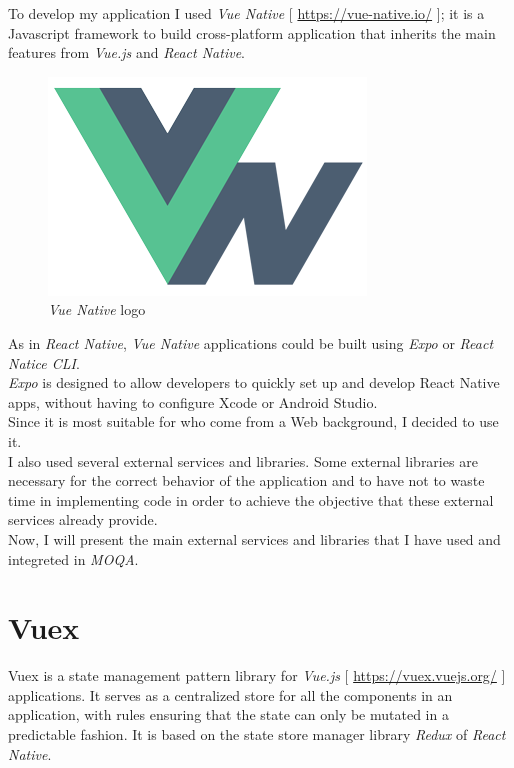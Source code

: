 To develop my application I used \textit{Vue Native} [ \url{https://vue-native.io/} ]; it is a Javascript framework to build cross-platform application that inherits the main features from \textit{Vue.js} and \textit{React Native}.\\ 

\begin{figure}[h]
\begin{center}
  \includegraphics[width=.5\textwidth]{img/logos/logo_vuenative.png}
  \hspace{0.05\linewidth}
  \centering
  \caption{\textit{Vue Native} logo}
  \label{img:logo_vuenative}
\end{center}
\end{figure}

As in \textit{React Native}, \textit{Vue Native} applications could be built using \textit{Expo} or \textit{React Natice CLI}.\\

\textit{Expo} is designed to allow developers to quickly set up and develop React Native apps, without having to configure Xcode or Android Studio.\\
Since it is most suitable for who come from a Web background, I decided to use it.\\

I also used several external services and libraries.
Some external libraries are necessary for the correct behavior of the application and to have not to waste time in implementing code in order to achieve the objective that these external services already provide.\\

Now, I will present the main external services and libraries that I have used and integreted in \textit{MOQA}.

\section{Vuex}
Vuex is a state management pattern library for \textit{Vue.js} [ \url{https://vuex.vuejs.org/} ] applications. It serves as a centralized store for all the components in an application, with rules ensuring that the state can only be mutated in a predictable fashion. It is based on the state store manager library \textit{Redux} of \textit{React Native}.\\

